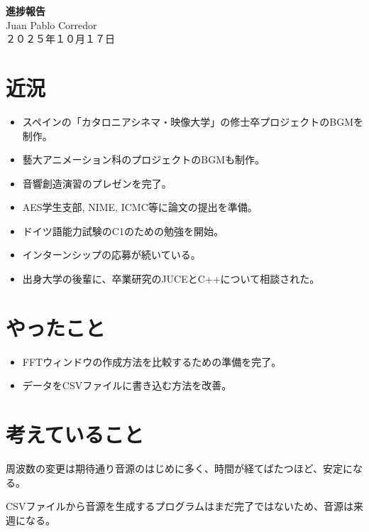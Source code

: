 \documentclass[a4paper, 11pt]{article}
\begin{document}
\begin{center}
    {\LARGE \bfseries 進捗報告} \\ %
    \vspace{0.3em} %
    Juan Pablo Corredor \\ %
    ２０２５年１０月１７日 %
\end{center}
\vspace{0.5em} %

\section*{近況}
\begin{itemize}
    \item スペインの「カタロニアシネマ・映像大学」の修士卒プロジェクトのBGMを制作。
    \item 藝大アニメーション科のプロジェクトのBGMも制作。
    \item 音響創造演習のプレゼンを完了。
    \item AES学生支部, NIME, ICMC等に論文の提出を準備。
    \item ドイツ語能力試験のC1のための勉強を開始。
    \item インターンシップの応募が続いている。
    \item 出身大学の後輩に、卒業研究のJUCEとC++について相談された。
\end{itemize} 

\section*{やったこと}
\begin{itemize}
    \item FFTウィンドウの作成方法を比較するための準備を完了。
    \item データをCSVファイルに書き込む方法を改善。
\end{itemize}


\section*{考えていること}

周波数の変更は期待通り音源のはじめに多く、時間が経てばたつほど、安定になる。

CSVファイルから音源を生成するプログラムはまだ完了ではないため、音源は来週になる。

\end{document}

